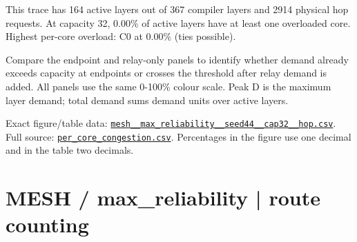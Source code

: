 \documentclass[10pt,a4paper]{article}
\begin{document}
This trace has 164 active layers out of 367 compiler layers and 2914 physical hop requests. At capacity 32, 0.00\% of active layers have at least one overloaded core. Highest per-core overload: C0 at 0.00\% (ties possible).\par
Compare the endpoint and relay-only panels to identify whether demand already exceeds capacity at endpoints or crosses the threshold after relay demand is added. All panels use the same 0-100\% colour scale. Peak D is the maximum layer demand; total demand sums demand units over active layers.\par
Exact figure/table data: \href{\detokenize{file:///home/dhruv-pansuriya/Documents/BTP/Compiler-Driven-ACE/output/pdf/qaoa_methods_congestion/tables/mesh__max_reliability__seed44__cap32__hop.csv}}{\nolinkurl{mesh__max_reliability__seed44__cap32__hop.csv}}. Full source: \href{\detokenize{file:///home/dhruv-pansuriya/Documents/BTP/Compiler-Driven-ACE/results/qaoa_2seed_2026-10-26/congestion/per_core_congestion.csv}}{\nolinkurl{per_core_congestion.csv}}. Percentages in the figure use one decimal and in the table two decimals.\par
\clearpage
\section*{MESH / max\_reliability | route counting}
\end{document}
